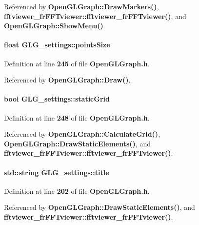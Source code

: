 Referenced by {\bf Open\+G\+L\+Graph\+::\+Draw\+Markers()}, {\bf fftviewer\+\_\+fr\+F\+F\+Tviewer\+::fftviewer\+\_\+fr\+F\+F\+Tviewer()}, and {\bf Open\+G\+L\+Graph\+::\+Show\+Menu()}.

\paragraph[{points\+Size}]{\setlength{\rightskip}{0pt plus 5cm}float G\+L\+G\+\_\+settings\+::points\+Size}\label{structGLG__settings_a4a99ad9851048d2b3e68df54bf9b3664}


Definition at line {\bf 245} of file {\bf Open\+G\+L\+Graph.\+h}.



Referenced by {\bf Open\+G\+L\+Graph\+::\+Draw()}.

\paragraph[{static\+Grid}]{\setlength{\rightskip}{0pt plus 5cm}bool G\+L\+G\+\_\+settings\+::static\+Grid}\label{structGLG__settings_aeb07273d59a53c41ff9de7f464dc4fc4}


Definition at line {\bf 248} of file {\bf Open\+G\+L\+Graph.\+h}.



Referenced by {\bf Open\+G\+L\+Graph\+::\+Calculate\+Grid()}, {\bf Open\+G\+L\+Graph\+::\+Draw\+Static\+Elements()}, and {\bf fftviewer\+\_\+fr\+F\+F\+Tviewer\+::fftviewer\+\_\+fr\+F\+F\+Tviewer()}.

\paragraph[{title}]{\setlength{\rightskip}{0pt plus 5cm}std\+::string G\+L\+G\+\_\+settings\+::title}\label{structGLG__settings_a721667a8fd26ecdc5529cf67ca4772e7}


Definition at line {\bf 202} of file {\bf Open\+G\+L\+Graph.\+h}.



Referenced by {\bf Open\+G\+L\+Graph\+::\+Draw\+Static\+Elements()}, and {\bf fftviewer\+\_\+fr\+F\+F\+Tviewer\+::fftviewer\+\_\+fr\+F\+F\+Tviewer()}.

